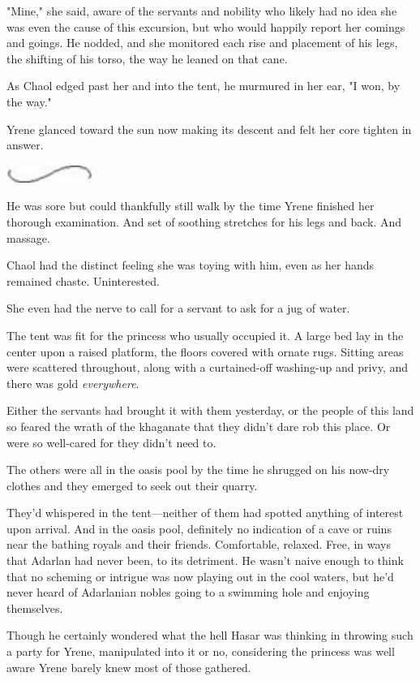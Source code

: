 "Mine," she said, aware of the servants and nobility who likely had no idea she was even the cause of this excursion, but who would happily report her comings and goings. He nodded, and she monitored each rise and placement of his legs, the shifting of his torso, the way he leaned on that cane.

As Chaol edged past her and into the tent, he murmured in her ear, "I won, by the way."

Yrene glanced toward the sun now making its descent and felt her core tighten in answer.

\includegraphics[width=1.12in,height=0.24in]{images/seperator}

He was sore but could thankfully still walk by the time Yrene finished her thorough examination. And set of soothing stretches for his legs and back. And massage.

Chaol had the distinct feeling she was toying with him, even as her hands remained chaste. Uninterested.

She even had the nerve to call for a servant to ask for a jug of water.

The tent was fit for the princess who usually occupied it. A large bed lay in the center upon a raised platform, the floors covered with ornate rugs. Sitting areas were scattered throughout, along with a curtained-off washing-up and privy, and there was gold
\emph{everywhere}.

Either the servants had brought it with them yesterday, or the people of this land so feared the wrath of the khaganate that they didn't dare rob this place. Or were so well-cared for they didn't need to.

The others were all in the oasis pool by the time he shrugged on his now-dry clothes and they emerged to seek out their quarry.

They'd whispered in the tent---neither of them had spotted anything of interest upon arrival. And in the oasis pool, definitely no indication of a cave or ruins near the bathing royals and their friends. Comfortable, relaxed. Free, in ways that Adarlan had never been, to its detriment. He wasn't naive enough to think that no scheming or intrigue was now playing out in the cool waters, but he'd never heard of Adarlanian nobles going to a swimming hole and enjoying themselves.

Though he certainly wondered what the hell Hasar was thinking in throwing such a party for Yrene, manipulated into it or no, considering the princess was well aware Yrene barely knew most of those gathered.


